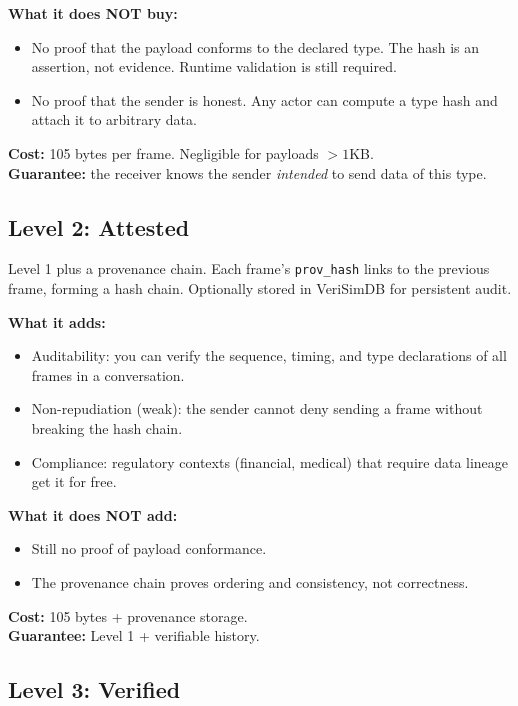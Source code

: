\documentclass[11pt,a4paper]{article}
\begin{document}
\textbf{What it does NOT buy:}
\begin{itemize}
\item No proof that the payload conforms to the declared type. The hash
  is an assertion, not evidence. Runtime validation is still required.
\item No proof that the sender is honest. Any actor can compute a type
  hash and attach it to arbitrary data.
\end{itemize}

\textbf{Cost:} 105 bytes per frame. Negligible for payloads $> 1$KB.\\
\textbf{Guarantee:} the receiver knows the sender \emph{intended} to
send data of this type.

\subsection{Level 2: Attested}

Level 1 plus a provenance chain. Each frame's \texttt{prov\_hash} links
to the previous frame, forming a hash chain. Optionally stored in
VeriSimDB for persistent audit.

\textbf{What it adds:}
\begin{itemize}
\item Auditability: you can verify the sequence, timing, and type
  declarations of all frames in a conversation.
\item Non-repudiation (weak): the sender cannot deny sending a frame
  without breaking the hash chain.
\item Compliance: regulatory contexts (financial, medical) that require
  data lineage get it for free.
\end{itemize}

\textbf{What it does NOT add:}
\begin{itemize}
\item Still no proof of payload conformance.
\item The provenance chain proves ordering and consistency, not
  correctness.
\end{itemize}

\textbf{Cost:} 105 bytes + provenance storage.\\
\textbf{Guarantee:} Level 1 + verifiable history.

\subsection{Level 3: Verified}
\end{document}
